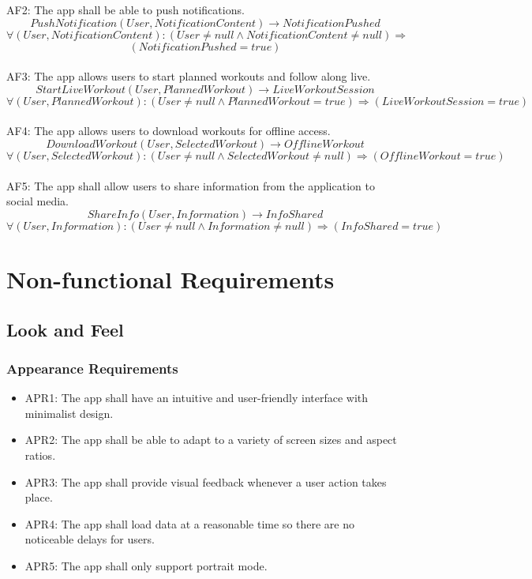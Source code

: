 \documentclass[12pt]{article}
\begin{document}
AF2: The app shall be able to push notifications.
\[PushNotification(User, NotificationContent) \rightarrow NotificationPushed \]
\[ \forall (User, NotificationContent): (User \neq null \land NotificationContent \neq null) \Rightarrow\] \[(NotificationPushed = true) \]\\

AF3: The app allows users to start planned workouts and follow along live.
\[StartLiveWorkout(User, PlannedWorkout) \rightarrow LiveWorkoutSession \]
\[ \forall (User, PlannedWorkout): (User \neq null \land PlannedWorkout = true) \Rightarrow (LiveWorkoutSession = true) \]\\

AF4: The app allows users to download workouts for offline access.
\[DownloadWorkout(User, SelectedWorkout) \rightarrow OfflineWorkout \]
\[ \forall (User, SelectedWorkout): (User \neq null \land SelectedWorkout \neq null) \Rightarrow (OfflineWorkout = true) \]\\

AF5: The app shall allow users to share information from the application to social media.
\[ShareInfo(User, Information) \rightarrow InfoShared \]
\[ \forall (User, Information): (User \neq null \land Information \neq null) \Rightarrow (InfoShared = true) \]

\section{Non-functional Requirements}

\subsection{Look and Feel}

\subsubsection{Appearance Requirements}
\begin{itemize}
\item APR1: The app shall have an intuitive and user-friendly interface with minimalist design.
\item APR2: The app shall be able to adapt to a variety of screen sizes and aspect ratios.
\item APR3: The app shall provide visual feedback whenever a user action takes place.
\item APR4: The app shall load data at a reasonable time so there are no noticeable delays for users.
\item APR5: The app shall only support portrait mode.
\end{itemize}
\end{document}
